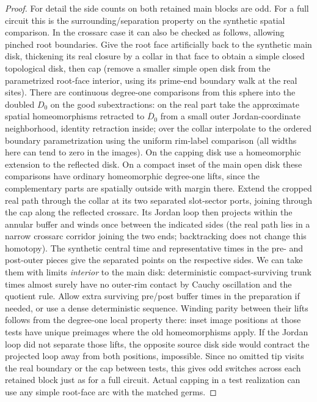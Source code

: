 \begin{proof}
For detail the side counts on both retained main blocks are odd. For a full circuit this
is the surrounding/separation property on the synthetic spatial comparison. In the
crossarc case it can also be checked as follows, allowing pinched root boundaries. Give
the root face artificially back to the synthetic main disk, thickening its real closure by
a collar in that face to obtain a simple closed topological disk, then cap (remove a
smaller simple open disk from the parametrized root-face interior, using its prime-end
boundary walk at the real sites). There are continuous degree-one comparisons from this
sphere into the doubled \(D_0\) on the good subextractions: on the real part take the
approximate spatial homeomorphisms retracted to \(\overline D_0\) from a small outer
Jordan-coordinate neighborhood, identity retraction inside; over the collar interpolate to
the ordered boundary parametrization using the uniform rim-label comparison (all widths
here can tend to zero in the images). On the capping disk use a homeomorphic extension to
the reflected disk. On a compact inset of the main open disk these comparisons have
ordinary homeomorphic degree-one lifts, since the complementary parts are spatially
outside with margin there. Extend the cropped real path through the collar at its two
separated slot-sector ports, joining through the cap along the reflected crossarc. Its
Jordan loop then projects within the annular buffer and winds once between the indicated
sides (the real path lies in a narrow crossarc corridor joining the two ends; backtracking
does not change this homotopy). The synthetic central time and representative times in the
pre- and post-outer pieces give the separated points on the respective sides. We can take
them with limits \emph{interior} to the main disk: deterministic compact-surviving trunk
times almost surely have no outer-rim contact by Cauchy oscillation and the quotient rule.
Allow extra surviving pre/post buffer times in the preparation if needed, or use a dense
deterministic sequence. Winding parity between their lifts follows from the degree-one
local property there: inset image positions at those tests have unique preimages where the
old homeomorphisms apply. If the Jordan loop did not separate those lifts, the opposite
source disk side would contract the projected loop away from both positions, impossible.
Since no omitted tip visits the real boundary or the cap between tests, this gives odd
switches across each retained block just as for a full circuit. Actual capping in a test
realization can use any simple root-face arc with the matched germs.


\end{proof}
